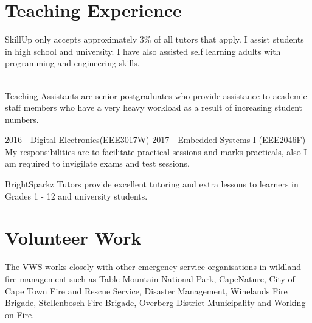 \documentclass[]{deedy-resume-openfont}
\begin{document}
\begin{minipage}[t]{0.66\textwidth} 

\section{Teaching Experience}

SkillUp only accepts approximately 3\% of all tutors that apply. I assist students in high school and university. I have also assisted self learning adults with programming and engineering skills.
\sectionsep

\\
Teaching Assistants are senior postgraduates who provide assistance to academic staff members who have a very heavy workload as a result of increasing student numbers.
\sectionsep

2016 - Digital Electronics(EEE3017W)
2017 - Embedded Systems I (EEE2046F)
My responsibilities are to facilitate practical sessions and marks practicals, also I am required to invigilate exams and test sessions.
\sectionsep

BrightSparkz Tutors provide excellent tutoring and extra lessons to learners in Grades 1 - 12 and university students. 
\sectionsep


\section{Volunteer Work}

The VWS works closely with other emergency service organisations in wildland fire management such as Table Mountain National Park, CapeNature, City of Cape Town Fire and Rescue Service, Disaster Management, Winelands Fire Brigade, Stellenbosch Fire Brigade, Overberg District Municipality and Working on Fire.
\sectionsep


\end{minipage}
\end{document}
